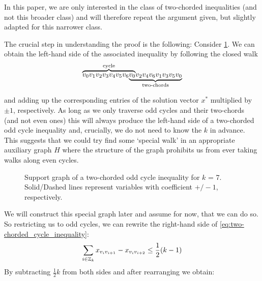 In this paper, we are only interested in the class of two-chorded inequalities (and not this broader class) and will therefore repeat the argument given, but slightly adapted for this narrower class.

The crucial step in understanding the proof is the following:
Consider \cref{fig:support_graph_two-chorded_odd_cycle_inequality}.
We can obtain the left-hand side of the associated inequality by following the closed walk
\[
\mathrlap{\overbrace{\phantom{v_{0} v_{1} v_{2} v_{3} v_{4} v_{5} v_{6} v_{0}}}^{\text{cycle}}}
v_{0} v_{1} v_{2} v_{3} v_{4} v_{5} v_{6}
\mathrlap{\underbrace{\phantom{v_{0} v_{2} v_{4} v_{6} v_{1} v_{3} v_{5} v_{0}}}_{\text{two-chords}}}
v_{0} v_{2} v_{4} v_{6} v_{1} v_{3} v_{5} v_{0}
\]


and adding up the corresponding entries of the solution vector $x^{*}$ multiplied by $\pm 1$, respectively.
As long as we only traverse odd cycles and their two-chords (and not even ones) this will always produce the left-hand side of a two-chorded odd cycle inequality and, crucially, we do not need to know the $k$ in advance.
This suggests that we could try find some ‘special walk’ in an appropriate auxiliary graph $H$ where the structure of the graph prohibits us from ever taking walks along even cycles.

\begin{figure}[H]
	\centering
	\caption[Support graph of a two-chorded odd cycle inequality]{Support graph of a two-chorded odd cycle inequality for $k$ = 7.
	Solid/Dashed lines represent variables with coefficient $+ / - 1$, respectively.}
	\label{fig:support_graph_two-chorded_odd_cycle_inequality}
\end{figure}

We will construct this special graph later and assume for now, that we can do so.
So restricting us to odd cycles, we can rewrite the right-hand side of \cref{eq:two-chorded_cycle_inequality}:
\begin{equation*}
	\sum_{i \in \mathbb{Z}_k} x_{v_i v_{i+1}} - x_{v_i v_{i+2}} \leq \frac{1}{2} (k-1)
\end{equation*}
By subtracting $\frac{1}{2}k$ from both sides and after rearranging we obtain:

